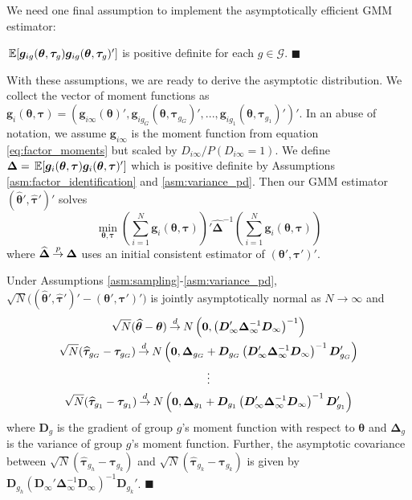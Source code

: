 \documentclass[12pt]{article}
\begin{document}
We need one final assumption to implement the asymptotically efficient GMM estimator:
\begin{assumption}\label{asm:variance_pd}
  $\expec{\bm g_{ig}(\bm \theta, \bm \tau_g) \bm g_{ig}(\bm \theta, \bm \tau_g)'}$ is positive definite for each $g \in \mathcal{G}$. $\blacksquare$
\end{assumption}

With these assumptions, we are ready to derive the asymptotic distribution. We collect the vector of moment functions as $\bm g_i(\bm \theta, \bm \tau) = (\bm g_{i\infty}(\bm \theta)', \bm g_{ig_G}(\bm \theta, \bm \tau_{g_G})',...,\bm g_{ig_1}(\bm \theta, \bm \tau_{g_1})')'$. In an abuse of notation, we assume $\bm g_{i\infty}$ is the moment function from equation \eqref{eq:factor_moments} but scaled by $D_{i\infty} / P(D_{i \infty} = 1)$. We define $\bm \Delta = \expec{\bm g_i(\bm \theta, \bm \tau) \bm g_i(\bm \theta, \bm \tau)'}$ which is positive definite by Assumptions \ref{asm:factor_identification} and \ref{asm:variance_pd}. Then our GMM estimator $(\widehat{ \bm \theta}', \widehat{ \bm \tau}')'$ solves
\begin{equation}\label{eq:minimization_problem}
  \min_{\bm \theta, \bm \tau} \left( \sum_{i = 1}^N \bm g_i(\bm \theta, \bm \tau) \right)' \widehat{\bm \Delta}^{-1} \left( \sum_{i = 1}^N \bm g_i(\bm \theta, \bm \tau) \right)
\end{equation}
where $\widehat{\bm \Delta} \mathbin{\overset{p}{\to}} \bm \Delta$ uses an initial consistent estimator of $(\bm \theta', \bm \tau')'$. 

\begin{theorem}\label{theorem:asymptotic_distribution}
  Under Assumptions \ref{asm:sampling}-\ref{asm:variance_pd}, $\sqrt{N}\big((\widehat{\bm \theta}', \widehat{\bm \tau}')' - (\bm \theta', \bm \tau')'\big)$ is jointly asymptotically normal as $N \rightarrow \infty$ and
  \begin{gather*}
    \sqrt{N}(\widehat{\bm \theta} - \bm \theta) \mathbin{\overset{d}{\to}} N \left( \bm 0, \left( \bm D'_{\infty} \bm \Delta_{\infty}^{-1} \bm D_{\infty} \right)^{-1} \right) \\
    \sqrt{N}(\widehat{\bm \tau}_{g_G} - \bm \tau_{g_G}) \mathbin{\overset{d}{\to}} N \left( \bm 0, \bm \Delta_{g_G} + \bm D_{g_G} \left( \bm D'_{\infty} \bm \Delta_{\infty}^{-1} \bm D_{\infty} \right)^{-1} \bm D_{g_G}'  \right)\\
    \vdots\\
    \sqrt{N}(\widehat{\bm \tau}_{g_1} - \bm \tau_{g_1}) \mathbin{\overset{d}{\to}} N \left( \bm 0, \bm \Delta_{g_1} + \bm D_{g_1} \left( \bm D'_{\infty} \bm \Delta_{\infty}^{-1} \bm D_{\infty} \right)^{-1} \bm D_{g_1}' \right)
  \end{gather*}
where $\bm D_g$ is the gradient of group $g$'s moment function with respect to $\bm \theta$ and $\bm \Delta_g$ is the variance of group $g$'s moment function. Further, the asymptotic covariance between $\sqrt{N}(\widehat{\bm \tau}_{g_h} - \bm \tau_{g_k})$ and $\sqrt{N}(\widehat{\bm \tau}_{g_k} - \bm \tau_{g_k})$ is given by $\bm D_{g_h} (\bm D_{\infty}' \bm \Delta_{\infty}^{-1} \bm D_{\infty})^{-1} \bm D_{g_k}'$. $\blacksquare$
\end{theorem}
\end{document}
